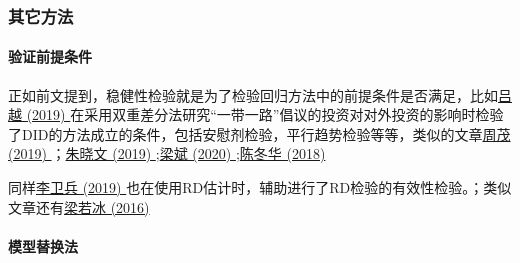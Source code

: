\documentclass[11pt,a4paper]{ctexart}
\begin{document}
\subsubsection{其它方法}

\paragraph{验证前提条件}

正如前文提到，稳健性检验就是为了检验回归方法中的前提条件是否满足，比如\href{https://kns.cnki.net/KCMS/detail/detail.aspx?dbcode=CJFQ&dbname=CJFDLAST2019&filename=JJYJ201909013&uid=WEEvREcwSlJHSldRa1FhcTdnTnhYWUN2MXgyaDJoK1N4QlRFK2pRdXFrWT0=$9A4hF_YAuvQ5obgVAqNKPCYcEjKensW4IQMovwHtwkF4VYPoHbKxJw!!&v=MDcwNDFYMUx1eFlTN0RoMVQzcVRyV00xRnJDVVI3cWZZT1J0Rnl6bVVML1BMeWZTWkxHNEg5ak1wbzlFWjRSOGU=}{吕越
(2019)
}在采用双重差分法研究``一带一路''倡议的投资对对外投资的影响时检验了DID的方法成立的条件，包括安慰剂检验，平行趋势检验等等，类似的文章\href{https://xueshu.baidu.com/usercenter/paper/show?paperid=140b0td0yr3j0pe0wt2004t0wk291611&site=xueshu_se&hitarticle=1}{周茂
(2019)
}；\href{https://xueshu.baidu.com/usercenter/paper/show?paperid=1y5q0xw02f400xg0583p04n0ke012299&site=xueshu_se&hitarticle=1}{朱晓文
(2019)
};\href{https://kns.cnki.net/KCMS/detail/detail.aspx?dbcode=CJFQ&dbname=CJFDLAST2020&filename=JJYJ202003015&uid=WEEvREcwSlJHSldRa1FhcTdnTnhYWUN2MXh5K2o3djRZWGhKYtextbfJWkg1cz0=$9A4hF_YAuvQ5obgVAqNKPCYcEjKensW4IQMovwHtwkF4VYPoHbKxJw!!&v=MzAwOTJUM3FUcldNMUZyQ1VSN3FmWU9SdEZ5M2xXcjNQTHlmU1pMRzRITkhNckk5RVlZUjhlWDFMdXhZUzdEaDE=}{梁斌
(2020)
};\href{https://xueshu.baidu.com/usercenter/paper/show?paperid=157v02y0pe7002h0vq7202h0h0260622&site=xueshu_se}{陈冬华
(2018)}

同样\href{https://xueshu.baidu.com/usercenter/paper/show?paperid=1a770p60a52b0ec0225k0ew0mx070151&site=xueshu_se}{李卫兵
(2019)
}也在使用RD估计时，辅助进行了RD检验的有效性检验。；类似文章还有\href{https://xueshu.baidu.com/usercenter/paper/show?paperid=5d75dc04b5aed32753d6fd1605ff024c&site=xueshu_se}{梁若冰
(2016)}

\paragraph{模型替换法}
\end{document}
